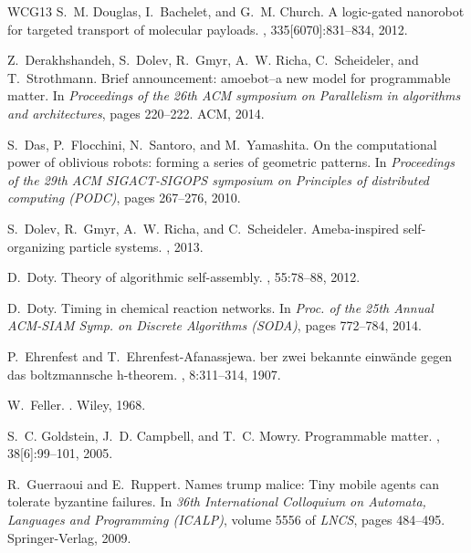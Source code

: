 \documentclass[oribibl, 11pt]{llncs}
\begin{document}
\begin{thebibliography}{WCG{\etalchar{+}}13}
S.~M. Douglas, I.~Bachelet, and G.~M. Church.
\newblock A logic-gated nanorobot for targeted transport of molecular payloads.
, 335[6070]:831--834, 2012.

Z.~Derakhshandeh, S.~Dolev, R.~Gmyr, A.~W. Richa, C.~Scheideler, and
  T.~Strothmann.
\newblock Brief announcement: amoebot--a new model for programmable matter.
\newblock In {\em Proceedings of the 26th ACM symposium on Parallelism in
  algorithms and architectures}, pages 220--222. ACM, 2014.

S.~Das, P.~Flocchini, N.~Santoro, and M.~Yamashita.
\newblock On the computational power of oblivious robots: forming a series of
  geometric patterns.
\newblock In {\em Proceedings of the 29th ACM SIGACT-SIGOPS symposium on
  Principles of distributed computing (PODC)}, pages 267--276, 2010.

S.~Dolev, R.~Gmyr, A.~W. Richa, and C.~Scheideler.
\newblock Ameba-inspired self-organizing particle systems.
, 2013.

D.~Doty.
\newblock Theory of algorithmic self-assembly.
, 55:78--88, 2012.

D.~Doty.
\newblock Timing in chemical reaction networks.
\newblock In {\em Proc. of the 25th Annual ACM-SIAM Symp. on Discrete
  Algorithms (SODA)}, pages 772--784, 2014.

P.~Ehrenfest and T.~Ehrenfest-Afanassjewa.
ber zwei bekannte einw{\"a}nde gegen das boltzmannsche
  h-theorem.
, 8:311--314, 1907.

W.~Feller.
.
\newblock Wiley, 1968.

S.~C. Goldstein, J.~D. Campbell, and T.~C. Mowry.
\newblock Programmable matter.
, 38[6]:99--101, 2005.

R.~Guerraoui and E.~Ruppert.
\newblock Names trump malice: Tiny mobile agents can tolerate byzantine
  failures.
\newblock In {\em 36th International Colloquium on Automata, Languages and
  Programming (ICALP)}, volume 5556 of {\em LNCS}, pages 484--495.
  Springer-Verlag, 2009.


\end{thebibliography}
\end{document}
